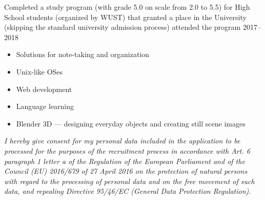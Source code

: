\documentclass[10pt,a4paper,ragged2e,withhyper]{altacv}
\begin{document}
\begin{paracol}{2}
\divider


\divider

{Completed a study program (with grade 5.0 on scale from 2.0 to 5.5)
for High School students (organized by WUST)
that granted a place in the University
(skipping the standard university admission process)
\newline \smallskip
attended the program 2017–2018}



\begin{itemize}
  \item Solutions for note-taking and organization
  \item Unix-like OSes
  \item Web development
  \item Language learning
  \item Blender 3D — designing everyday objects and creating still scene images
\end{itemize}





\divider

\end{paracol}

\smallskip

\small\textit{I hereby give consent for my personal data included in the application to be processed for the purposes of the recruitment process in accordance with Art. 6 paragraph 1 letter a of the Regulation of the European Parliament and of the Council (EU) 2016/679 of 27 April 2016 on the protection of natural persons with regard to the processing of personal data and on the free movement of such data, and repealing Directive 95/46/EC (General Data Protection Regulation).}
\end{document}

